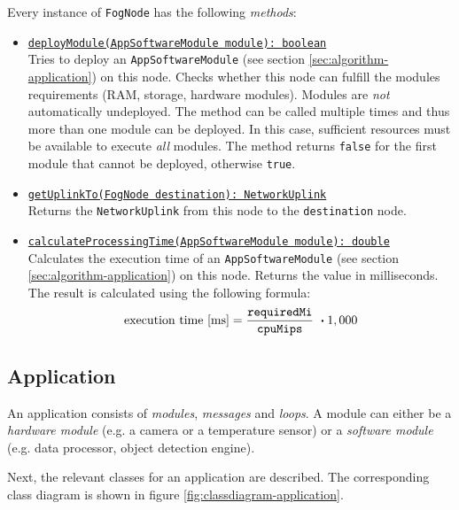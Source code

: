\begin{itemize}
    Every instance of \texttt{FogNode} has the following \textit{methods}:
    \begin{itemize}
        \item \underline{\texttt{deployModule(AppSoftwareModule module): boolean}}\\ [0.5ex] 
        Tries to deploy an \texttt{AppSoftwareModule} (see section \ref{sec:algorithm-application}) on this node. Checks whether this node can fulfill the modules requirements (RAM, storage, hardware modules). Modules are \textit{not} automatically undeployed. The method can be called multiple times and thus more than one module can be deployed. In this case, sufficient resources must be available to execute \textit{all} modules. The method returns \texttt{false} for the first module that cannot be deployed, otherwise \texttt{true}.
        
        \item \underline{\texttt{getUplinkTo(FogNode destination): NetworkUplink}}\\ [0.5ex] 
        Returns the \texttt{NetworkUplink} from this node to the \texttt{destination} node.
        
        \item \underline{\texttt{calculateProcessingTime(AppSoftwareModule module): double}}\\ [0.5ex] 
        Calculates the execution time of an \texttt{AppSoftwareModule} (see section \ref{sec:algorithm-application}) on this node. Returns the value in milliseconds. The result is calculated using the following formula:
        \[\textrm{execution time [ms]} = \frac{\textrm{\texttt{requiredMi}}}{\textrm{\texttt{cpuMips}}}\ \boldsymbol{\cdot} 1,000\]
    \end{itemize}

\end{itemize}


\subsection{Application\label{sec:algorithm-application}}

An application consists of \textit{modules}, \textit{messages} and \textit{loops}. A module can either be a \textit{hardware module} (e.g. a camera or a temperature sensor) or a \textit{software module} (e.g. data processor, object detection engine).

Next, the relevant classes for an application are described. The corresponding class diagram is shown in figure \ref{fig:classdiagram-application}.

